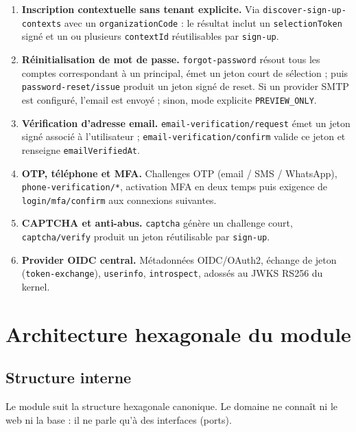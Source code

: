 \documentclass[11pt,a4paper,oneside]{report}
\newcommand{\code}[1]{\texttt{\small #1}}
\begin{document}
\begin{enumerate}[leftmargin=1.6em,itemsep=2pt]
  \code{USER\_PLAN\_UPDATED}, \code{USER\_ONBOARDING\_UPDATED}) sont inscrites dans l'audit
  système via \code{kernel-core}.
  \item \textbf{Inscription contextuelle sans tenant explicite.} Via
  \code{discover-sign-up-contexts} avec un \code{organizationCode} : le résultat inclut un
  \code{selectionToken} signé et un ou plusieurs \code{contextId} réutilisables par
  \code{sign-up}.
  \item \textbf{Réinitialisation de mot de passe.} \code{forgot-password} résout tous les
  comptes correspondant à un principal, émet un jeton court de sélection ; puis
  \code{password-reset/issue} produit un jeton signé de reset. Si un provider SMTP est
  configuré, l'email est envoyé ; sinon, mode explicite \code{PREVIEW\_ONLY}.
  \item \textbf{Vérification d'adresse email.} \code{email-verification/request} émet un jeton
  signé associé à l'utilisateur ; \code{email-verification/confirm} valide ce jeton et
  renseigne \code{emailVerifiedAt}.
  \item \textbf{OTP, téléphone et MFA.} Challenges OTP (email / SMS / WhatsApp),
  \code{phone-verification/*}, activation MFA en deux temps puis exigence de
  \code{login/mfa/confirm} aux connexions suivantes.
  \item \textbf{CAPTCHA et anti-abus.} \code{captcha} génère un challenge court,
  \code{captcha/verify} produit un jeton réutilisable par \code{sign-up}.
  \item \textbf{Provider OIDC central.} Métadonnées OIDC/OAuth2, échange de jeton
  (\code{token-exchange}), \code{userinfo}, \code{introspect}, adossés au JWKS RS256 du kernel.
\end{enumerate}

\chapter{Architecture hexagonale du module}
\section{Structure interne}
Le module suit la structure hexagonale canonique. Le domaine ne connaît ni le web ni la
base : il ne parle qu'à des interfaces (ports).
\end{document}
